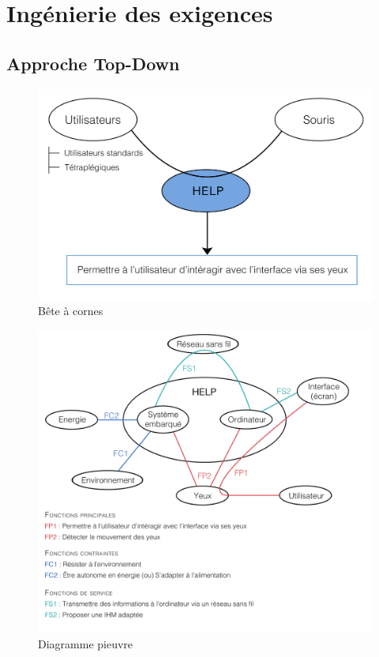 \chapter{Ingénierie des exigences}
\section{Approche Top-Down}
\label{sec:top-down}
\begin{figure}[h]
  \centering
  \includegraphics[scale=1]{BeteACornes}
  \caption{Bête à cornes}
  \label{fig:bac}
\end{figure}

\begin{figure}[H]
  \centering
  \includegraphics[scale=0.9]{Pieuvre}
  \caption{Diagramme pieuvre}
  \label{fig:pieuvre}
\end{figure}

